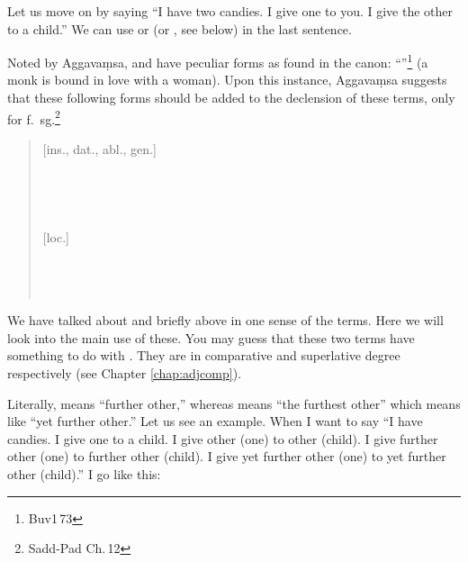 Let us move on by saying ``I have two candies. I give one to you. I give the other to a child.'' We can use  or  (or , see below) in the last sentence.


Noted by Aggava\d msa,  and  have peculiar forms as found in the canon: ``''\footnote{Buv1\,73} (a monk is bound in love with a woman). Upon this instance, Aggava\d msa suggests that these following forms should be added to the declension of these terms, only for f.\ sg.\footnote{Sadd-Pad Ch.\,12}

\begin{quote}
{[ins., dat., abl., gen.]} \\
 \\
 \\
 \\
 \\
{[loc.]} \\
 \\
 \\
 \\
\end{quote}

We have talked about  and  briefly above in one sense of the terms. Here we will look into the main use of these. You may guess that these two terms have something to do with . They are  in comparative and superlative degree respectively (see Chapter \ref{chap:adjcomp}).

Literally,  means ``further other,'' whereas  means ``the furthest other'' which means like ``yet further other.'' Let us see an example. When I want to say ``I have candies. I give one to a child. I give other (one) to other (child). I give further other (one) to further other (child). I give yet further other (one) to yet further other (child).'' I go like this:

